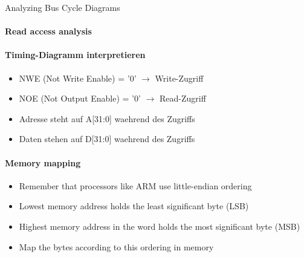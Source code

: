 \begin{KR}{Analyzing Bus Cycle Diagrams}
\paragraph{Read access analysis}
\paragraph{Timing-Diagramm interpretieren}
    \begin{itemize}
        \item NWE (Not Write Enable) = '0' $\rightarrow$ Write-Zugriff
        \item NOE (Not Output Enable) = '0' $\rightarrow$ Read-Zugriff
        \item Adresse steht auf A[31:0] waehrend des Zugriffs
        \item Daten stehen auf D[31:0] waehrend des Zugriffs
    \end{itemize}

\paragraph{Memory mapping}
\begin{itemize}
    \item Remember that processors like ARM use little-endian ordering
    \item Lowest memory address holds the least significant byte (LSB)
    \item Highest memory address in the word holds the most significant byte (MSB)
    \item Map the bytes according to this ordering in memory
\end{itemize}
\end{KR}

